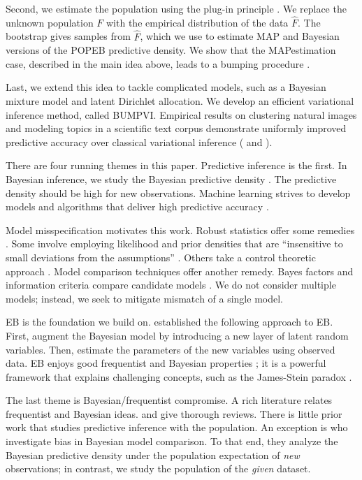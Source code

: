 Second, we estimate the population using the plug-in principle
\citep{efron1994introduction}. We replace the unknown population $F$
with the empirical distribution of the data $\widehat{F}$. The
bootstrap gives samples from $\widehat{F}$, which we use to estimate
\gls{MAP} and Bayesian versions of the \gls{POPEB} predictive
density. We show that the \gls{MAP}\break estimation case, described
in the main idea above, leads to a bumping procedure
\citep{tibshirani1999model}.

Last, we extend this idea to tackle complicated models, such as a
Bayesian mixture model and latent Dirichlet allocation. We develop an
efficient variational inference method, called \gls{BUMPVI}. Empirical
results on clustering natural images and modeling topics in a
scientific text corpus demonstrate uniformly improved predictive
accuracy over classical variational inference
( and
).

There are four running themes in this paper. Predictive inference is
the first.  In Bayesian inference, we study the Bayesian predictive
density \citep{geisser1993predictive}. The predictive density should
be high for new observations. Machine learning strives to develop
models and algorithms that deliver high predictive accuracy
\citep{bishop2006pattern}.

Model misspecification motivates this work. Robust statistics offer some
remedies \citep{berger1994overview}. Some involve employing
likelihood and prior densities that are ``insensitive to small deviations
from the assumptions'' \citep{huber2009robust}. Others take a control theoretic
approach \citep{hansen2008robustness}. Model comparison techniques offer another
remedy. Bayes factors and information criteria compare
candidate models \citep{vehtari2012survey,gelman2013bayesian}. We do not
consider multiple models; instead, we seek to mitigate mismatch of a
single model.

\Gls{EB} is the foundation we build on.
\citet{robbins1955empirical,robbins1964empirical} established
the following approach to \gls{EB}.
First, augment the Bayesian model by introducing a new layer of latent random
variables. Then, estimate the parameters of the new variables using
observed data. \gls{EB} enjoys good frequentist and Bayesian properties
\citep{carlin2000bayes,efron2010large}; it is a powerful framework that
explains challenging concepts, such as the James-Stein paradox
\citep{young2005essentials}.

The last theme is Bayesian/frequentist compromise.
A rich literature relates frequentist and Bayesian ideas.
\citet{bayarri2004interplay} and \citet{aitkin2010statistical} give thorough
reviews.
There is little prior work that studies predictive
inference with the population. An exception is
\citet{gelman2013understanding} who investigate bias in Bayesian model
comparison. To that end,
they analyze the Bayesian predictive density under the population expectation of
\emph{new} observations; in contrast, we study the population of the
\emph{given} dataset.
